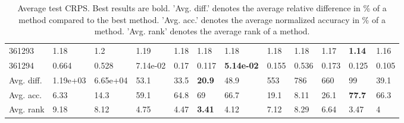 \begin{table}[ht!]
\begin{tabular}{llllllllllll}
  361293 & 1.18 & 1.2 & 1.19 & 1.18 & 1.18 & 1.18 & 1.18 & 1.18 & 1.17 & \textbf{1.14} & 1.16 \\ 
  361294 & 0.664 & 0.528 & 7.14e-02 & 0.17 & 0.117 & \textbf{5.14e-02} & 0.155 & 0.536 & 0.173 & 0.125 & 0.105 \\ 
   \hline
Avg. diff. & 1.19e+03 & 6.65e+04 & 53.1 & 33.5 & \textbf{20.9} & 48.9 & 553 & 786 & 660 & 99 & 39.1 \\ 
  Avg. acc. & 6.33 & 14.3 & 59.1 & 64.8 & 69 & 66.7 & 19.1 & 8.11 & 26.1 & \textbf{77.7} & 66.3 \\ 
  Avg. rank & 9.18 & 8.12 & 4.75 & 4.47 & \textbf{3.41} & 4.12 & 7.12 & 8.29 & 6.64 & 3.47 & 4 \\ 
   \hline
\hline
\end{tabular}
\endgroup
\caption{Average test CRPS. 
                  Best results are bold. 
                  'Avg. diff.' denotes the average relative difference in \% of a method compared to the best method.
                  'Avg. acc.' denotes the average normalized accuracy in \% of a method.
                  'Avg. rank' denotes the average rank of a method.} 
\label{TABLES/table_results_CRPS_k_medoids}
\end{table}
